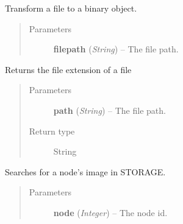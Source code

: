 \documentclass[letterpaper,10pt,english]{sphinxmanual}
\begin{document}

\begin{fulllineitems}
\label{filesystem:filesystem.FileToBase64}
Transform a file to a binary object.
\begin{quote}\begin{description}
\item[{Parameters}] \leavevmode
\textbf{filepath} (\emph{String}) -- The file path.

\end{description}\end{quote}

\end{fulllineitems}


\begin{fulllineitems}
\label{filesystem:filesystem.GetFileExtension}
Returns the file extension of a file
\begin{quote}\begin{description}
\item[{Parameters}] \leavevmode
\textbf{path} (\emph{String}) -- The file path.

\item[{Return type}] \leavevmode
String

\end{description}\end{quote}

\end{fulllineitems}


\begin{fulllineitems}
\label{filesystem:filesystem.GetNodeImg}
Searches for a node's image in STORAGE.
\begin{quote}\begin{description}
\item[{Parameters}] \leavevmode
\textbf{node} (\emph{Integer}) -- The node id.

\end{description}\end{quote}

\end{fulllineitems}
\end{document}

